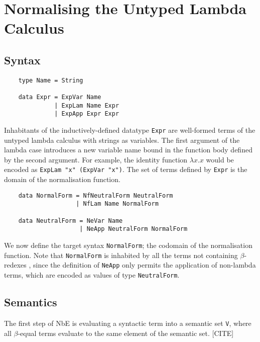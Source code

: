\chapter{Normalising the Untyped Lambda Calculus}
\label{chap:untypednbe}

\section{Syntax}

\begin{lstlisting}
    type Name = String

    data Expr = ExpVar Name
              | ExpLam Name Expr
              | ExpApp Expr Expr
\end{lstlisting}

Inhabitants of the inductively-defined datatype \lstinline{Expr} are well-formed terms of the untyped lambda calculus with strings as variables. The first argument of the lambda case introduces a new variable name bound in the function body defined by the second argument. For example, the identity function $\lambda x . x$ would be encoded as \lstinline{ExpLam "x" (ExpVar "x")}. The set of terms defined by \lstinline{Expr} is the domain of the normalisation function.

\begin{lstlisting}
    data NormalForm = NfNeutralForm NeutralForm
                    | NfLam Name NormalForm

    data NeutralForm = NeVar Name
                     | NeApp NeutralForm NormalForm
\end{lstlisting}

We now define the target syntax \lstinline{NormalForm}; the codomain of the normalisation function. Note that \lstinline{NormalForm} is inhabited by all the terms not containing $\beta$-redexes \cite{slides}, since the definition of \lstinline{NeApp} only permits the application of non-lambda terms, which are encoded as values of type \lstinline{NeutralForm}.


\section{Semantics}

The first step of NbE is evaluating a syntactic term into a semantic set \lstinline{V}, where all $\beta$-equal terms evaluate to the same element of the semantic set. [CITE]

